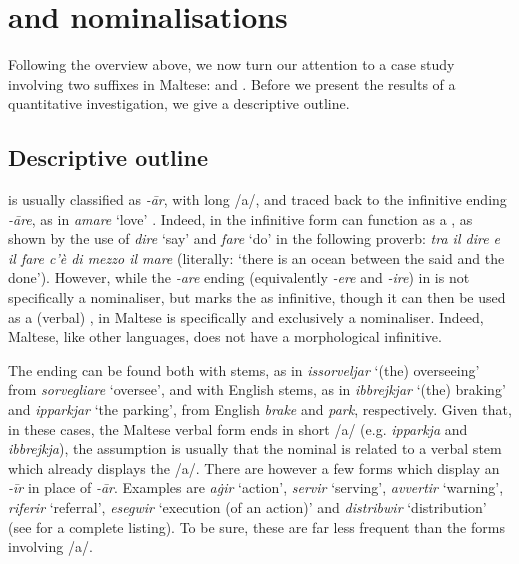\documentclass[output=paper]{LSP/langsci}
\begin{document}
\section{{\ar} and {\zjoni} nominalisations}\label{sec:descriptive}
Following the overview above, we now turn our attention to a case study involving two  suffixes in Maltese: {\ar} and \zjoni. Before we present the results of a quantitative investigation, we give a descriptive outline.
 
\subsection{Descriptive outline}
{\ar} is usually classified as \textit{-ār}, with long /a/, and traced back to the  infinitive ending \textit{-āre}, as in \textit{amare} `love' \citep[249]{Mifsud1995:Loan}. Indeed, in  the infinitive form can function as a , as shown by the use of \textit{dire} `say' and \textit{fare}  `do' in the following proverb: \textit{tra il dire e il fare c’è di mezzo il mare} (literally: `there is an ocean between the said and the done'). However, while the \textit{-are} ending (equivalently \textit{-ere} and \textit{-ire}) in  is not specifically a nominaliser, but marks the  as infinitive, though it can then be used as a (verbal) , {\ar} in Maltese is specifically and exclusively a nominaliser. Indeed, Maltese, like other  languages, does not have a morphological infinitive.

The {\ar} ending can be found both with  stems, as in \textit{issorveljar} `(the) overseeing' from  \textit{sorvegliare} `oversee', and with English stems, as in \textit{ibbrejkjar} `(the) braking'  and \textit{ipparkjar} `the parking', from English \textit{brake} and \textit{park}, respectively. Given that, in these cases, the Maltese verbal form ends in short /a/ (e.g. \textit{ipparkja} and \textit{ibbrejkja}), the assumption is usually that the {\ar} nominal is related to a verbal stem which already displays the /a/. There are however a few forms which display an \textit{-īr} in place of \textit{-ār}. Examples are \textit{aġir} `action', \textit{servir} `serving', \textit{avvertir} `warning', \textit{riferir} `referral', \textit{esegwir} `execution (of an action)' and \textit{distribwir} `distribution' (see \citealt{Camilleri1993} for a complete listing). To be sure, these are far less frequent than the forms involving /a/.
\end{document}
